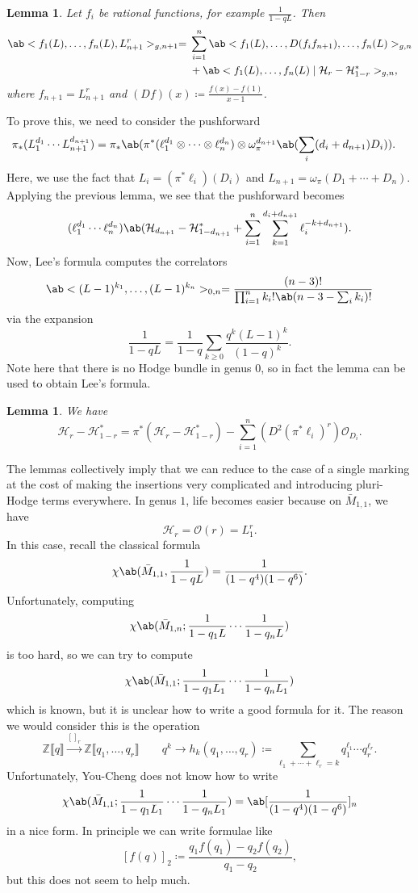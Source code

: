 \documentclass{amsart}
\newtheorem{lem}[thm]{Lemma}
\theoremstyle{definition}
\theoremstyle{remark}
\theoremstyle{plain}
\theoremstyle{definition}
\theoremstyle{remark}
\newcommand{\Z}{\mathbb{Z}}
\newcommand{\mc}[1]{\mathcal{#1}}
\newcommand{\1}{\mathbf{1}}
\newcommand{\2}{\mathbf{2}}
\newcommand{\3}{\mathbf{3}}
\newcommand{\ps}[1]{\llbracket #1 \rrbracket}
\begin{document}
\begin{lem}
    Let \(f_i\) be rational functions, for example \(\frac{1}{1-q L}\). Then
    \begin{align*}
        \ab<f_1(L), \ldots, f_n(L), L_{n+1}^r>_{g, n+1} ={}& \sum_{i=1}^n \ab<f_1(L), \ldots, D(f_i f_{n+1}), \ldots, f_n(L)>_{g, n} \\
        &+ \ab<f_1(L), \ldots, f_n(L) \mid \mc{H}_r - \mc{H}_{1-r}^*>_{g,n},
    \end{align*}
    where \(f_{n+1} = L_{n+1}^r\) and \((Df)(x) \coloneqq \frac{f(x)-f(1)}{x-1}\).
\end{lem}

To prove this, we need to consider the pushforward
\begin{align*}
    \pi_* (L_1^{d_1} \cdots L_{n+1}^{d_{n+1}}) &= \pi_* \ab(\pi^*(\ell_1^{d_1} \otimes \cdots \otimes \ell_n^{d_n}) \otimes \omega_{\pi}^{d_{n+1}}\ab(\sum_i (d_i+d_{n+1})D_i)).
\end{align*}
Here, we use the fact that \(L_i = (\pi^* \ell_i)(D_i)\) and \(L_{n+1} = \omega_{\pi}(D_1 + \cdots + D_n)\). Applying the previous lemma, we see that the pushforward becomes
\[ (\ell_1^{d_1} \cdots \ell_n^{d_n})\ab(\mc{H}_{d_{n+1}} - \mc{H}_{1-d_{n+1}}^* + \sum_{i=1}^n \sum_{k=1}^{d_i + d_{n+1}} \ell_i^{-k+d_{n+1}}). \]
Now, Lee's formula computes the correlators
\[ \ab<(L-1)^{k_1}, \ldots, (L-1)^{k_n}>_{0,n} = \frac{(n-3)!}{\prod_{i=1}^n k_i! \ab(n-3-\sum_i k_i)!} \]
via the expansion
\[ \frac{1}{1-qL} = \frac{1}{1-q} \sum_{k \geq 0} \frac{q^k(L-1)^k}{(1-q)^k}. \]
Note here that there is no Hodge bundle in genus \(0\), so in fact the lemma can be used to obtain Lee's formula.

\begin{lem}
    We have
    \[ \mc{H}_r - \mc{H}_{1-r}^* = \pi^* (\mc{H}_r - \mc{H}_{1-r}^*) - \sum_{i=1}^n (D^2 (\pi^* \ell_i)^r) \mc{O}_{D_i}. \]
\end{lem}

The lemmas collectively imply that we can reduce to the case of a single marking at the cost of making the insertions very complicated and introducing pluri-Hodge terms everywhere. In genus \(1\), life becomes easier because on \(\bar{M}_{1,1}\), we have 
\[ \mc{H}_r = \mc{O}(r) = L_1^r. \]
In this case, recall the classical formula
\[ \chi\ab(\bar{M}_{1,1}, \frac{1}{1-qL}) = \frac{1}{(1-q^4)(1-q^6)}. \]
Unfortunately, computing
\[ \chi\ab(\bar{M}_{1,n}; \frac{1}{1-q_1 L} \cdots \frac{1}{1-q_n L}) \]
is too hard, so we can try to compute
\[ \chi\ab(\bar{M}_{1,1}; \frac{1}{1-q_1 L_1} \cdots \frac{1}{1-q_n L_1})  \]
which is known, but it is unclear how to write a good formula for it. The reason we would consider this is the operation
\[ \Z\ps{q} \xrightarrow{[]_r} \Z\ps{q_1, \ldots, q_r} \qquad q^k \to h_k(q_1, \ldots, q_r) \coloneqq \sum_{\ell_1 + \cdots + \ell_r = k} q_1^{\ell_1} \cdots q_r^{\ell_r}. \]
Unfortunately, You-Cheng does not know how to write
\[ \chi\ab(\bar{M}_{1,1}; \frac{1}{1-q_1 L_1} \cdots \frac{1}{1-q_n L_1}) = \ab[\frac{1}{(1-q^4)(1-q^6)}]_n \]
in a nice form. In principle we can write formulae like
\[ [f(q)]_2 \coloneqq \frac{q_1 f(q_1) - q_2 f(q_2)}{q_1 - q_2}, \]
but this does not seem to help much.
\end{document}
